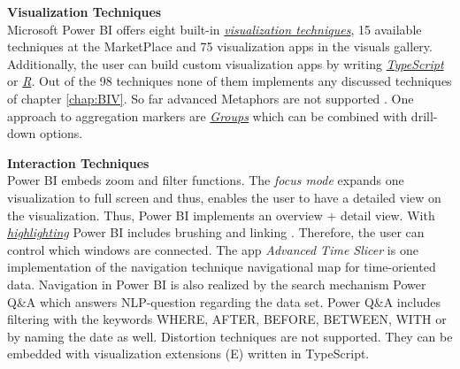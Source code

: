 \textbf{Visualization Techniques}\\
Microsoft Power BI offers eight built-in \href{https://powerbi.microsoft.com/en-us/documentation/powerbi-service-visualization-types-for-reports-and-q-and-a/}{\textit{visualization techniques}}, 15 available techniques at the MarketPlace and 75 visualization apps in the visuals gallery. Additionally, the user can build custom visualization apps by writing \href{https://powerbi.microsoft.com/en-us/documentation/powerbi-custom-visuals-getting-started-with-developer-tools/}{\textit{TypeScript}} or \href{https://powerbi.microsoft.com/en-us/guided-learning/powerbi-learning-3-11h-r-visual-integration/}{\textit{R}}. Out of the 98 techniques none of them implements any discussed techniques of chapter \ref{chap:BIV}. So far advanced Metaphors are not supported  \cite{Amanda2016}. One approach to aggregation markers are \hyperlink{https://Power BI.microsoft.com/de-de/blog/power-bi-desktop-october-feature-summary/#grouping}{\textit{Groups}} which can be combined with drill-down options.
\par

\textbf{Interaction Techniques}\\
Power BI embeds zoom and filter functions. The \textit{focus mode} expands one visualization to full screen and thus, enables the user to have a detailed view on the visualization. Thus, Power BI implements an overview + detail view. 
With \href{https://powerbi.microsoft.com/en-us/documentation/powerbi-service-about-filters-and-highlighting-in-reports/}{\textit{highlighting}} Power BI includes brushing and linking  \cite{BI2017}. Therefore, the user can control which windows are connected. The app \textit{Advanced Time Slicer} is one implementation of the navigation technique navigational map for time-oriented data. Navigation in Power BI is also realized by the search mechanism Power Q\&A which answers NLP-question regarding the data set. Power Q&A includes filtering with the keywords WHERE, AFTER, BEFORE, BETWEEN, WITH or by naming the date as well. Distortion techniques are not supported. They can be embedded with visualization extensions  (E) written in TypeScript.

